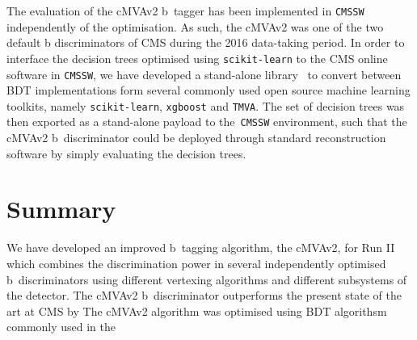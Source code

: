 The evaluation of the cMVAv2 b~tagger has been implemented in \texttt{CMSSW} independently of the optimisation. As such, the cMVAv2 was one of the two default b discriminators of CMS during the 2016 data-taking period. In order to interface the decision trees optimised using \texttt{scikit-learn} to the CMS online software in \texttt{CMSSW}, we have developed a stand-alone library~\cite{mlglue} to convert between BDT implementations form several commonly used open source machine learning toolkits, namely \texttt{scikit-learn}, \texttt{xgboost} and \texttt{TMVA}. The set of decision trees was then exported as a stand-alone payload to the~\texttt{CMSSW} environment, such that the cMVAv2 b~discriminator could be deployed through standard reconstruction software by simply evaluating the decision trees.

\section{Summary}
We have developed an improved b~tagging algorithm, the cMVAv2, for Run II which combines the discrimination power in several independently optimised b~discriminators using different vertexing algorithms and different subsystems of the detector. The cMVAv2 b~discriminator outperforms the present state of the art at CMS by  
The cMVAv2 algorithm was optimised using BDT algorithsm commonly used in the  